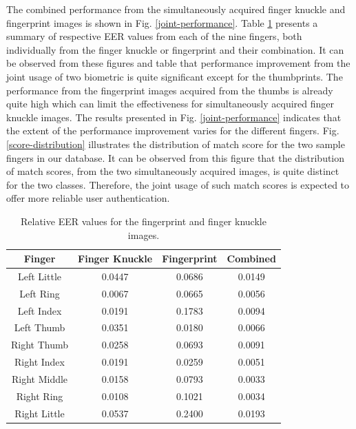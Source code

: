The combined performance from the simultaneously acquired finger knuckle and fingerprint images is shown in Fig. \ref{joint-performance}. Table \ref{fusion-eer} presents a summary of respective EER values from each of the nine fingers, both individually from the finger knuckle or fingerprint and their combination. It can be observed from these figures and table that performance improvement from the joint usage of two biometric is quite significant except for the thumbprints. The performance from the fingerprint images acquired from the thumbs is already quite high which can limit the effectiveness for simultaneously acquired finger knuckle images. The results presented in Fig. \ref{joint-performance} indicates that the extent of the performance improvement varies for the different fingers. Fig. \ref{score-distribution} illustrates the distribution of match score for the two sample fingers in our database. It can be observed from this figure that the distribution of match scores, from the two simultaneously acquired images, is quite distinct for the two classes. Therefore, the joint usage of such match scores is expected to offer more reliable user authentication.

\begin{table}[ht]
    \centering
    \caption{Relative EER values for the fingerprint and finger knuckle images.}
    \begin{tabular}{cccc}
    \hline
    Finger       & Finger Knuckle & Fingerprint & Combined \\ \hline
    Left Little  & 0.0447        & 0.0686     & 0.0149  \\
    Left Ring    & 0.0067        & 0.0665    & 0.0056  \\
    Left Index   & 0.0191        & 0.1783     & 0.0094  \\
    Left Thumb   & 0.0351        & 0.0180     & 0.0066  \\
    Right Thumb  & 0.0258        & 0.0693     & 0.0091  \\
    Right Index  & 0.0191        & 0.0259     & 0.0051  \\
    Right Middle & 0.0158        & 0.0793     & 0.0033  \\
    Right Ring   & 0.0108        & 0.1021     & 0.0034  \\
    Right Little & 0.0537        & 0.2400     & 0.0193  \\ \hline
    \end{tabular}
    \label{fusion-eer}
\end{table}


